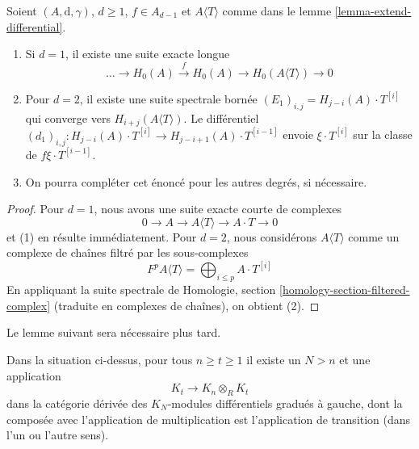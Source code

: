 \begin{lemma}

\label{lemma-compute-cohomology-adjoin-variable}

Soient $(A, \text{d}, \gamma)$, $d \geq 1$, $f \in A_{d - 1}$ et $A\langle T \rangle$ comme dans le lemme \ref{lemma-extend-differential}.

\begin{enumerate}

\item Si $d = 1$, il existe une suite exacte longue
$$
\ldots \to H_0(A) \xrightarrow{f} H_0(A) \to H_0(A\langle T \rangle) \to 0
$$

\item Pour $d = 2$, il existe une suite spectrale bornée
$(E_1)_{i, j} = H_{j - i}(A) \cdot T^{[i]}$
qui converge vers $H_{i + j}(A\langle T \rangle)$. Le différentiel
$(d_1)_{i, j} : H_{j - i}(A) \cdot T^{[i]} \to
H_{j - i + 1}(A) \cdot T^{[i - 1]}$
envoie $\xi \cdot T^{[i]}$ sur la classe de $f \xi \cdot T^{[i - 1]}$.
\item On pourra compléter cet énoncé pour les autres degrés, si nécessaire.

\end{enumerate}

\end{lemma}

\begin{proof}
Pour $d = 1$, nous avons une suite exacte courte de complexes
$$
0 \to A \to A\langle T \rangle \to A \cdot T \to 0
$$
et (1) en résulte immédiatement. Pour $d = 2$, nous considérons $A\langle T \rangle$ comme un complexe de chaînes filtré par les sous-complexes
$$
F^pA\langle T \rangle = \bigoplus\nolimits_{i \leq p} A \cdot T^{[i]}
$$
En appliquant la suite spectrale de Homologie, section \ref{homology-section-filtered-complex} (traduite en complexes de chaînes), on obtient (2).
\end{proof}

\noindent
Le lemme suivant sera nécessaire plus tard.

\begin{lemma}

\label{lemma-construct-some-maps}

Dans la situation ci-dessus, pour tous $n \geq t \geq 1$ il existe un $N > n$
et une application
$$
K_t \longrightarrow K_n \otimes_R K_t
$$
dans la catégorie dérivée des $K_N$-modules différentiels gradués à gauche, dont la composée avec l'application de multiplication est l'application de transition (dans l'un ou l'autre sens).

\end{lemma}


